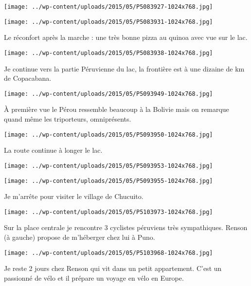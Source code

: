 \centerline{\texttt{[image: ../wp-content/uploads/2015/05/P5083927-1024x768.jpg]} } 
 \newline
 \newline
\centerline{\texttt{[image: ../wp-content/uploads/2015/05/P5083931-1024x768.jpg]} } 
 \newline
 Le réconfort après la marche : une très bonne pizza au quinoa avec vue sur le lac. \newline
 \newline
\centerline{\texttt{[image: ../wp-content/uploads/2015/05/P5083938-1024x768.jpg]} } 
 \newline
 Je continue vers la partie Péruvienne du lac, la frontière est à une dizaine de km de Copacabana. \newline
 \newline
\centerline{\texttt{[image: ../wp-content/uploads/2015/05/P5093949-1024x768.jpg]} } 
 \newline
 À première vue le Pérou ressemble beaucoup à la Bolivie mais on remarque quand même les triporteurs, omniprésents. \newline
 \newline
\centerline{\texttt{[image: ../wp-content/uploads/2015/05/P5093950-1024x768.jpg]} } 
 \newline
 La route continue à longer le lac. \newline
 \newline
\centerline{\texttt{[image: ../wp-content/uploads/2015/05/P5093953-1024x768.jpg]} } 
 \newline
 \newline
\centerline{\texttt{[image: ../wp-content/uploads/2015/05/P5093955-1024x768.jpg]} } 
 \newline
 Je m'arrête pour visiter le village de Chucuito. \newline
 \newline
\centerline{\texttt{[image: ../wp-content/uploads/2015/05/P5103973-1024x768.jpg]} } 
 \newline
 Sur la place centrale je rencontre 3 cyclistes péruviens très sympathiques. Renson (à gauche) propose de m'héberger chez lui à Puno. \newline
 \newline
\centerline{\texttt{[image: ../wp-content/uploads/2015/05/P5103968-1024x768.jpg]} } 
 \newline
 Je reste 2 jours chez Renson qui vit dans un petit appartement. C'est un passionné de vélo et il prépare un voyage en vélo en Europe. \newline

